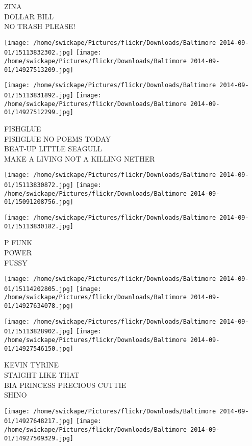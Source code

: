 \documentclass[10pt,letterpaper]{article}
\begin{document}
ZINA\\
DOLLAR BILL\\
NO TRASH PLEASE!
\pagebreak

\texttt{[image: /home/swickape/Pictures/flickr/Downloads/Baltimore 2014-09-01/15113832302.jpg]}
\texttt{[image: /home/swickape/Pictures/flickr/Downloads/Baltimore 2014-09-01/14927513209.jpg]}

\texttt{[image: /home/swickape/Pictures/flickr/Downloads/Baltimore 2014-09-01/15113831892.jpg]}
\texttt{[image: /home/swickape/Pictures/flickr/Downloads/Baltimore 2014-09-01/14927512299.jpg]}

FISHGLUE\\
FISHGLUE NO POEMS TODAY\\
BEAT{-}UP LITTLE SEAGULL\\
MAKE A LIVING NOT A KILLING NETHER
\pagebreak

\texttt{[image: /home/swickape/Pictures/flickr/Downloads/Baltimore 2014-09-01/15113830872.jpg]}
\texttt{[image: /home/swickape/Pictures/flickr/Downloads/Baltimore 2014-09-01/15091208756.jpg]}

\vspace{0.25in}
\texttt{[image: /home/swickape/Pictures/flickr/Downloads/Baltimore 2014-09-01/15113830182.jpg]}

P FUNK\\
POWER\\
FUSSY
\pagebreak

\texttt{[image: /home/swickape/Pictures/flickr/Downloads/Baltimore 2014-09-01/15114202805.jpg]}
\texttt{[image: /home/swickape/Pictures/flickr/Downloads/Baltimore 2014-09-01/14927634078.jpg]}

\texttt{[image: /home/swickape/Pictures/flickr/Downloads/Baltimore 2014-09-01/15113828902.jpg]}
\texttt{[image: /home/swickape/Pictures/flickr/Downloads/Baltimore 2014-09-01/14927546150.jpg]}

KEVIN TYRINE\\
STAIGHT LIKE THAT\\
BIA PRINCESS PRECIOUS CUTTIE\\
SHINO
\pagebreak

\texttt{[image: /home/swickape/Pictures/flickr/Downloads/Baltimore 2014-09-01/14927648217.jpg]}
\texttt{[image: /home/swickape/Pictures/flickr/Downloads/Baltimore 2014-09-01/14927509329.jpg]}
\end{document}
